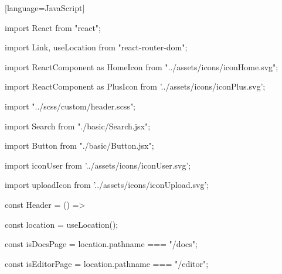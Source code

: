 \documentclass[a4paper,12pt]{article}
\begin{document}
[language=JavaScript]
\begin{description}
\item import React from "react";
\item import { Link, useLocation } from "react-router-dom";
\item import { ReactComponent as HomeIcon } from "../assets/icons/iconHome.svg";
\item import { ReactComponent as PlusIcon } from '../assets/icons/iconPlus.svg';
\item import "../scss/custom/header.scss";
\item import Search from "./basic/Search.jsx";
\item import Button from "./basic/Button.jsx";
\item import iconUser from '../assets/icons/iconUser.svg';
\item import uploadIcon from '../assets/icons/iconUpload.svg';

\item const Header = () => {
  \item const location = useLocation();
  \item const isDocsPage = location.pathname === "/docs";
  \item const isEditorPage = location.pathname === "/editor";

}
\end{description}
\end{document}
